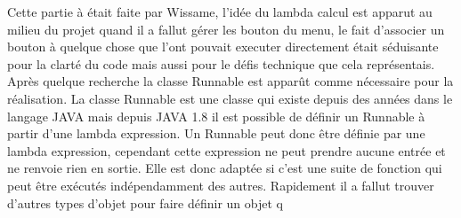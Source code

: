 Cette partie à était faite par Wissame, l'idée du lambda calcul est apparut au milieu du projet quand il a fallut gérer les bouton du menu, le fait d'associer un bouton à quelque chose que l'ont pouvait
executer directement était séduisante pour la clarté du code mais aussi pour le défis technique que cela représentais. Après quelque recherche la classe Runnable est apparût comme nécessaire pour
la réalisation.
\ml
La classe Runnable est une classe qui existe depuis des années dans le langage JAVA mais depuis JAVA 1.8 il est possible de définir un Runnable à partir d'une lambda expression. 
\ml
Un Runnable peut donc être définie par une lambda expression, cependant cette expression ne peut prendre aucune entrée et ne renvoie rien en sortie. Elle est donc adaptée si c'est une suite de fonction 
qui peut être exécutés indépendamment des autres. Rapidement il a fallut trouver d'autres types d'objet pour faire définir un objet q
